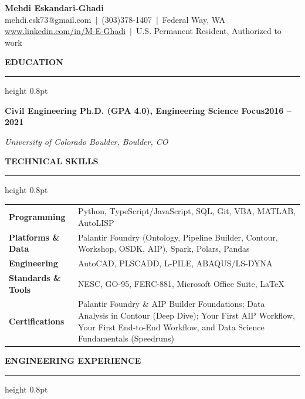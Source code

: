 \documentclass[10pt, letterpaper]{article}
\newcommand{\rsection}[1]{%
  \vspace{8pt}%
  {\large\bfseries\MakeUppercase{#1}}%
  \vspace{1pt}%
  \hrule height 0.8pt%
  \vspace{4pt}%
}
\newcommand{\jobline}[2]{%
  \vspace{5pt}%
  \noindent\textbf{#1}\hfill\textbf{#2}\par%
  \vspace{1pt}%
}
\newcommand{\subline}[1]{%
  \vspace{-1pt}%
  \noindent\textit{#1}\par%
  \vspace{1pt}%
}
\begin{document}
\pagestyle{empty}

\begin{center}
  {\LARGE\bfseries Mehdi Eskandari-Ghadi}\\[4pt]
  mehdi.esk73@gmail.com\ $|$\ (303)378-1407\ $|$\ Federal Way, WA\\[2pt]
  \href{http://www.linkedin.com/in/M-E-Ghadi}{www.linkedin.com/in/M-E-Ghadi}\ $|$\
  U.S. Permanent Resident, Authorized to work
\end{center}

\vspace{2pt}

\rsection{Education}

\jobline{Civil Engineering Ph.D. (GPA 4.0), Engineering Science Focus}{2016 -- 2021}
\subline{University of Colorado Boulder, Boulder, CO}

\rsection{Technical Skills}

\vspace{2pt}
\begin{tabular}{@{}p{3.4cm}p{14.4cm}@{}}
  \textbf{Programming}       & Python, TypeScript/JavaScript, SQL, Git, VBA, MATLAB, AutoLISP \\[2pt]
  \textbf{Platforms \& Data} & Palantir Foundry (Ontology, Pipeline Builder, Contour, Workshop, OSDK, AIP), Spark, Polars, Pandas \\[2pt]
  \textbf{Engineering}       & AutoCAD, PLSCADD, L-PILE, ABAQUS/LS-DYNA \\[2pt]
  \textbf{Standards \& Tools} & NESC, GO-95, FERC-881, Microsoft Office Suite, LaTeX \\[2pt]
  \textbf{Certifications}    & Palantir Foundry \& AIP Builder Foundations; Data Analysis in Contour (Deep Dive); Your First AIP Workflow, Your First End-to-End Workflow, and Data Science Fundamentals (Speedruns) \\
\end{tabular}

\rsection{Engineering Experience}
\end{document}
